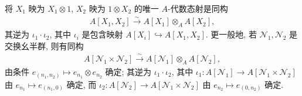 \begin{example*}
将 $X_1$ 映为 $X_1\otimes1$, $X_2$ 映为 $1\otimes X_2$ 的唯一 $A$-代数态射是同构
\begin{align*}
A[X_1,X_2]\xrightarrow{\sim}A[X_1]\otimes_A A[X_2],
\end{align*}
其逆为 $\iota_1\cdot\iota_2$, 其中 $\iota_i$ 是包含映射 $A[X_i]\hookrightarrow A[X_1,X_2]$. 更一般地, 若 $\mathcal N_1,\mathcal N_2$ 是交换幺半群, 则有同构
\begin{align*}
A[\mathcal N_1\times\mathcal N_2]\xrightarrow{\sim}A[\mathcal N_1]\otimes_A A[\mathcal N_2],
\end{align*}
由条件 $e_{(n_1,n_2)}\mapsto e_{n_1}\otimes e_{n_2}$ 确定; 其逆为 $\iota_1\cdot\iota_2$, 其中 $\iota_1:A[\mathcal N_1]\longrightarrow A[\mathcal N_1\times\mathcal N_2]$ 由 $e_{n_1}\mapsto e_{(n_1,0)}$ 确定, 而 $\iota_2:A[\mathcal N_2]\longrightarrow A[\mathcal N_1\times\mathcal N_2]$ 由 $e_{n_2}\mapsto e_{(0,n_2)}$ 确定.
\end{example*}

